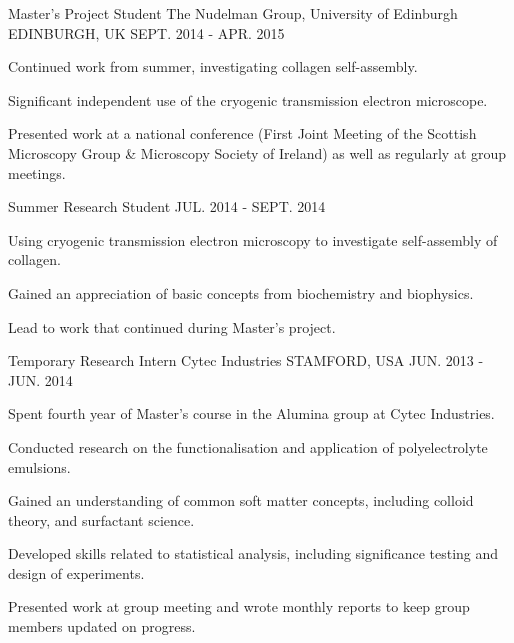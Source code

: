 \begin{cventries}
  \cventry
    {Master's Project Student}
    {The Nudelman Group, University of Edinburgh}
    {EDINBURGH, UK}
    {SEPT. 2014 - APR. 2015}
    {
      \begin{cvitems}
        \item {Continued work from summer, investigating collagen self-assembly.}
        \item {Significant independent use of the cryogenic transmission electron microscope.}
        \item {Presented work at a national conference (First Joint Meeting of the Scottish Microscopy Group \& Microscopy Society of Ireland) as well as regularly at group meetings.}
      \end{cvitems}
    }
  \cventry
    {Summer Research Student}
	  {}
    {}
    {JUL. 2014 - SEPT. 2014}
    {
      \begin{cvitems}
        \item {Using cryogenic transmission electron microscopy to investigate self-assembly of collagen.}
        \item {Gained an appreciation of basic concepts from biochemistry and biophysics.}
        \item {Lead to work that continued during Master's project.}
      \end{cvitems}
    }
  \cventry
    {Temporary Research Intern}
    {Cytec Industries}
    {STAMFORD, USA}
    {JUN. 2013 - JUN. 2014}
    {
      \begin{cvitems}
        \item {Spent fourth year of Master's course in the Alumina group at Cytec Industries.}
        \item {Conducted research on the functionalisation and application of polyelectrolyte emulsions.}
        \item {Gained an understanding of common soft matter concepts, including colloid theory, and surfactant science.}
        \item {Developed skills related to statistical analysis, including significance testing and design of experiments.}
		\item {Presented work at group meeting and wrote monthly reports to keep group members updated on progress.}
      \end{cvitems}
    }
\end{cventries}
